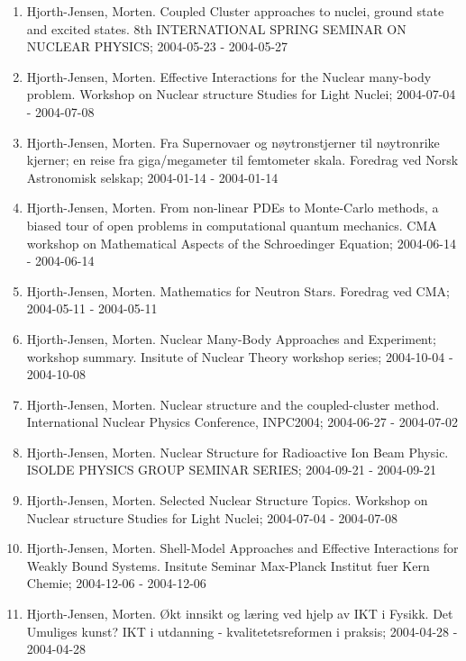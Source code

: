 \documentclass[a4wide,10pt]{article}
\begin{document}
\begin{enumerate}
\item Hjorth-Jensen, Morten.  Coupled Cluster approaches to nuclei, ground state and excited states. 8th INTERNATIONAL SPRING SEMINAR ON NUCLEAR PHYSICS; 2004-05-23 - 2004-05-27

\item Hjorth-Jensen, Morten.  Effective Interactions for the Nuclear many-body problem. Workshop on Nuclear structure Studies for Light Nuclei; 2004-07-04 - 2004-07-08

\item Hjorth-Jensen, Morten. Fra Supernovaer og nøytronstjerner til nøytronrike kjerner; en reise fra giga/megameter til femtometer skala. Foredrag ved Norsk Astronomisk selskap; 2004-01-14 - 2004-01-14

\item Hjorth-Jensen, Morten. From non-linear PDEs to Monte-Carlo methods, a biased tour of open problems in computational quantum mechanics. CMA workshop on Mathematical Aspects of the Schroedinger Equation; 2004-06-14 - 2004-06-14

\item Hjorth-Jensen, Morten. Mathematics for Neutron Stars. Foredrag ved CMA; 2004-05-11 - 2004-05-11

\item Hjorth-Jensen, Morten. Nuclear Many-Body Approaches and Experiment; workshop summary. Insitute of Nuclear Theory workshop series; 2004-10-04 - 2004-10-08

\item Hjorth-Jensen, Morten.  Nuclear structure and the coupled-cluster method. International Nuclear Physics Conference, INPC2004; 2004-06-27 - 2004-07-02

\item Hjorth-Jensen, Morten.  Nuclear Structure for Radioactive Ion Beam Physic. ISOLDE PHYSICS GROUP SEMINAR SERIES; 2004-09-21 - 2004-09-21

\item Hjorth-Jensen, Morten.  Selected Nuclear Structure Topics. Workshop on Nuclear structure Studies for Light Nuclei; 2004-07-04 - 2004-07-08

\item Hjorth-Jensen, Morten.  Shell-Model Approaches and Effective Interactions for Weakly Bound Systems. Insitute Seminar Max-Planck Institut fuer Kern Chemie; 2004-12-06 - 2004-12-06

\item Hjorth-Jensen, Morten. Økt innsikt og læring ved hjelp av IKT i Fysikk. Det Umuliges kunst? IKT i utdanning - kvalitetetsreformen i praksis; 2004-04-28 - 2004-04-28


\end{enumerate}
\end{document}
